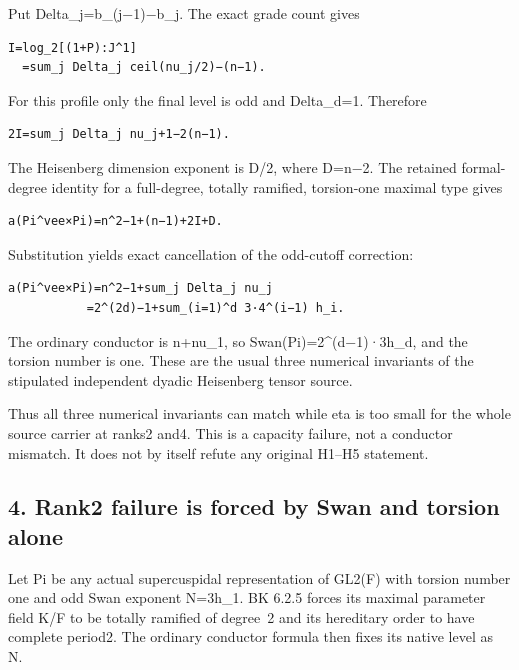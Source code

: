 Put Delta\_j=b\_(j−1)−b\_j. The exact grade count gives

\begin{Verbatim}[fontsize=\small,breaklines=true,breakanywhere=true]
I=log_2[(1+P):J^1]
  =sum_j Delta_j ceil(nu_j/2)−(n−1).
\end{Verbatim}

For this profile only the final level is odd and Delta\_d=1. Therefore

\begin{Verbatim}[fontsize=\small,breaklines=true,breakanywhere=true]
2I=sum_j Delta_j nu_j+1−2(n−1).
\end{Verbatim}

The Heisenberg dimension exponent is D/2, where D=n−2. The retained
formal-degree identity for a full-degree, totally ramified, torsion-one
maximal type gives

\begin{Verbatim}[fontsize=\small,breaklines=true,breakanywhere=true]
a(Pi^vee×Pi)=n^2−1+(n−1)+2I+D.
\end{Verbatim}

Substitution yields exact cancellation of the odd-cutoff correction:

\begin{Verbatim}[fontsize=\small,breaklines=true,breakanywhere=true]
a(Pi^vee×Pi)=n^2−1+sum_j Delta_j nu_j
           =2^(2d)−1+sum_(i=1)^d 3·4^(i−1) h_i.
\end{Verbatim}

The ordinary conductor is n+nu\_1, so Swan(Pi)=2\^{}(d−1)·3h\_d, and the
torsion number is one. These are the usual three numerical invariants of
the stipulated independent dyadic Heisenberg tensor source.

Thus all three numerical invariants can match while eta is too small for
the whole source carrier at ranks2 and4. This is a capacity failure, not
a conductor mismatch. It does not by itself refute any original H1--H5
statement.

\hypertarget{dyadic_capacity-rank2-failure-is-forced-by-swan-and-torsion-alone}{%
\subsection{4. Rank2 failure is forced by Swan and torsion
alone}\label{dyadic_capacity-rank2-failure-is-forced-by-swan-and-torsion-alone}}

Let Pi be any actual supercuspidal representation of GL2(F) with torsion
number one and odd Swan exponent N=3h\_1. BK 6.2.5 forces its maximal
parameter field K/F to be totally ramified of degree~2 and its hereditary
order to have complete period2. The ordinary conductor formula then
fixes its native level as N.

